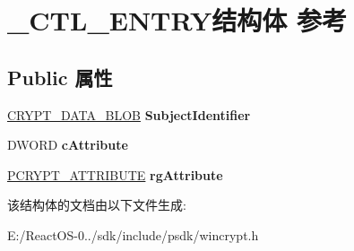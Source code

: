 \hypertarget{struct___c_t_l___e_n_t_r_y}{}\section{\+\_\+\+C\+T\+L\+\_\+\+E\+N\+T\+R\+Y结构体 参考}
\label{struct___c_t_l___e_n_t_r_y}
\subsection*{Public 属性}
\begin{DoxyCompactItemize}
\item 
\mbox{\label{struct___c_t_l___e_n_t_r_y_ac6ee932ad82af6282b20c896b4d2bf8f}} 
\hyperlink{struct___c_r_y_p_t_o_a_p_i___b_l_o_b}{C\+R\+Y\+P\+T\+\_\+\+D\+A\+T\+A\+\_\+\+B\+L\+OB} {\bfseries Subject\+Identifier}
\item 
\mbox{\label{struct___c_t_l___e_n_t_r_y_a148b309c52531c8019f933d56b381d24}} 
D\+W\+O\+RD {\bfseries c\+Attribute}
\item 
\mbox{\label{struct___c_t_l___e_n_t_r_y_ae86b12461a1b8b1646ce904517f03e7c}} 
\hyperlink{struct___c_r_y_p_t___a_t_t_r_i_b_u_t_e}{P\+C\+R\+Y\+P\+T\+\_\+\+A\+T\+T\+R\+I\+B\+U\+TE} {\bfseries rg\+Attribute}
\end{DoxyCompactItemize}


该结构体的文档由以下文件生成\+:\begin{DoxyCompactItemize}
\item 
E\+:/\+React\+O\+S-\/0../sdk/include/psdk/wincrypt.\+h\end{DoxyCompactItemize}
